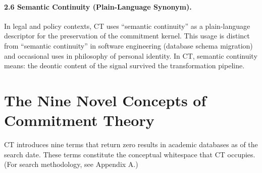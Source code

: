 \documentclass[11pt,a4paper]{article}
\begin{document}
\paragraph{2.6 Semantic Continuity (Plain-Language Synonym).}
In legal and policy contexts, CT uses ``semantic continuity'' as a plain-language descriptor for the preservation of the commitment kernel. This usage is distinct from ``semantic continuity'' in software engineering (database schema migration) and occasional uses in philosophy of personal identity. In CT, semantic continuity means: the deontic content of the signal survived the transformation pipeline.

\section{The Nine Novel Concepts of Commitment Theory}

CT introduces nine terms that return zero results in academic databases as of the search date. These terms constitute the conceptual whitespace that CT occupies. (For search methodology, see Appendix A.)
\end{document}
